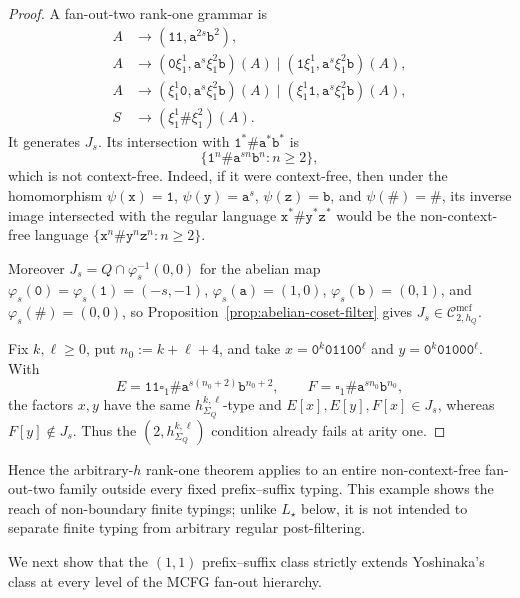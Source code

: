 \documentclass[11pt]{article}
\numberwithin{equation}{section}
\theoremstyle{plain}
\theoremstyle{definition}
\theoremstyle{remark}
\newcommand{\Cmcf}[2]{\mathcal{C}^{\mathrm{mcf}}_{#1,#2}}
\newcommand{\blank}{\square}
\begin{document}
\begin{proof}
A fan-out-two rank-one grammar is
\[
\begin{aligned}
 A&\to(\mathtt{11},\mathtt a^{2s}\mathtt b^2),\\
 A&\to(\mathtt 0\xi_1^1,\mathtt a^s\xi_1^2\mathtt b)(A)
   \mid(\mathtt 1\xi_1^1,\mathtt a^s\xi_1^2\mathtt b)(A),\\
 A&\to(\xi_1^1\mathtt 0,\mathtt a^s\xi_1^2\mathtt b)(A)
   \mid(\xi_1^1\mathtt 1,\mathtt a^s\xi_1^2\mathtt b)(A),\\
 S&\to(\xi_1^1\mathtt\#\xi_1^2)(A).
\end{aligned}
\]
It generates $J_s$.  Its intersection with
$\mathtt 1^*\mathtt\#\mathtt a^*\mathtt b^*$ is
\[
 \{\mathtt 1^n\mathtt\#\mathtt a^{sn}\mathtt b^n:n\ge2\},
\]
which is not context-free.  Indeed, if it were context-free, then under the
homomorphism
$\psi(\mathtt x)=\mathtt 1$, $\psi(\mathtt y)=\mathtt a^s$,
$\psi(\mathtt z)=\mathtt b$, and $\psi(\mathtt\#)=\mathtt\#$, its inverse
image intersected with the regular language
$\mathtt x^*\mathtt\#\mathtt y^*\mathtt z^*$ would be the non-context-free
language
$\{\mathtt x^n\mathtt\#\mathtt y^n\mathtt z^n:n\ge2\}$.

Moreover $J_s=Q\cap\varphi_s^{-1}(0,0)$ for the abelian map
$\varphi_s(\mathtt 0)=\varphi_s(\mathtt 1)=(-s,-1)$,
$\varphi_s(\mathtt a)=(1,0)$, $\varphi_s(\mathtt b)=(0,1)$, and
$\varphi_s(\mathtt\#)=(0,0)$, so
Proposition~\ref{prop:abelian-coset-filter} gives
$J_s\in\Cmcf{2}{h_Q}$.

Fix $k,\ell\ge0$, put $n_0:=k+\ell+4$, and take
$x=\mathtt 0^k\mathtt{0110}\mathtt 0^\ell$ and
$y=\mathtt 0^k\mathtt{0100}\mathtt 0^\ell$.  With
\[
 E=\mathtt{11}\blank_1\mathtt\#\mathtt a^{s(n_0+2)}\mathtt b^{n_0+2},
 \qquad F=\blank_1\mathtt\#\mathtt a^{sn_0}\mathtt b^{n_0},
\]
the factors $x,y$ have the same $h_{\Sigma_Q}^{k,\ell}$-type and
$E[x],E[y],F[x]\in J_s$, whereas $F[y]\notin J_s$.  Thus the
$(2,h_{\Sigma_Q}^{k,\ell})$ condition already fails at arity one.
\end{proof}

Hence the arbitrary-$h$ rank-one theorem applies to an entire non-context-free
fan-out-two family outside every fixed prefix--suffix typing.  This example
shows the reach of non-boundary finite typings; unlike $L_\star$ below, it is
not intended to separate finite typing from arbitrary regular post-filtering.

We next show that the $(1,1)$ prefix--suffix class strictly extends
Yoshinaka's class at every level of the MCFG fan-out hierarchy.
\end{document}
